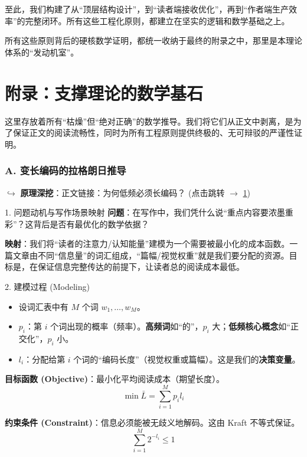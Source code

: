 \documentclass[11pt, a4paper]{ctexart}
\newcommand{\mathlink}[2]{%
	\par\noindent\hspace*{2em}\small\color{blue!60!black}
	$\hookrightarrow$ \textbf{原理深挖}：#2 (点击跳转 $\to$ \ref{#1})
}
\begin{document}
	至此，我们构建了从“顶层结构设计”，到“读者端接收优化”，再到“作者端生产效率”的完整闭环。所有这些工程化原则，都建立在坚实的逻辑和数学基础之上。
	
	所有这些原则背后的硬核数学证明，都统一收纳于最终的附录之中，那里是本理论体系的“发动机室”。
	
	
	\newpage
	\appendix
	\part*{附录：支撑理论的数学基石}
	
	这里存放着所有“枯燥”但“绝对正确”的数学推导。我们将它们从正文中剥离，是为了保证正文的阅读流畅性，同时为所有工程原则提供终极的、无可辩驳的严谨性证明。
	
	\section{A. 变长编码的拉格朗日推导} \label{math:vlc}
	\mathlink{math:vlc}{正文链接：为何低频必须长编码？}
	
	\begin{mathbox}{1. 问题动机与写作场景映射}
		\textbf{问题}：在写作中，我们凭什么说“重点内容要浓墨重彩”？这背后是否有最优化的数学依据？
		
		\textbf{映射}：我们将“读者的注意力/认知能量”建模为一个需要被最小化的成本函数。一篇文章由不同“信息量”的词汇组成，“篇幅/视觉权重”就是我们要分配的资源。目标是，在保证信息完整传达的前提下，让读者总的阅读成本最低。
	\end{mathbox}
	
	\begin{mathbox}{2. 建模过程 (Modeling)}
		\begin{itemize}
			\item 设词汇表中有 $M$ 个词 $w_1, \dots, w_M$。
			\item $p_i$：第 $i$ 个词出现的概率（频率）。\textbf{高频词}如“的”，$p_i$ 大；\textbf{低频核心概念}如“正交化”，$p_i$ 小。
			\item $l_i$：分配给第 $i$ 个词的“编码长度”（视觉权重或篇幅）。这是我们的\textbf{决策变量}。
		\end{itemize}
		
		\textbf{目标函数 (Objective)}：最小化平均阅读成本（期望长度）。
		$$ \min \bar{L} = \sum_{i=1}^{M} p_i l_i $$
		
		\textbf{约束条件 (Constraint)}：信息必须能被无歧义地解码。这由 Kraft 不等式保证。
		$$ \sum_{i=1}^{M} 2^{-l_i} \le 1 $$
	\end{mathbox}
	
\end{document}
